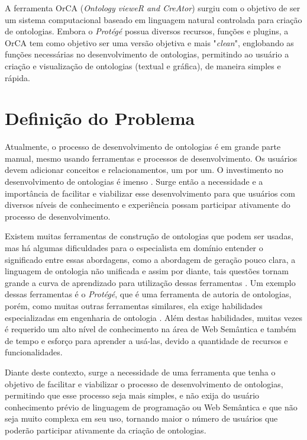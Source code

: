 \documentclass{bcc}
\begin{document}
A ferramenta OrCA (\textit{Ontology vieweR and CreAtor}) surgiu com o objetivo de ser um sistema computacional baseado em linguagem natural controlada para criação de ontologias. Embora o \textit{Protégé} possua diversos recursos, funções e plugins, a OrCA tem como objetivo ser uma versão objetiva e mais "\textit{clean}", englobando as funções necessárias no desenvolvimento de ontologias, permitindo ao usuário a criação e visualização de ontologias (textual e gráfica), de maneira simples e rápida.


\section{Definição do Problema}

Atualmente, o processo de desenvolvimento de ontologias é em grande parte manual, mesmo usando ferramentas e processos de desenvolvimento. Os usuários devem adicionar conceitos e relacionamentos, um por um. O investimento no desenvolvimento de ontologias é imenso \cite{liu2011}. Surge então a necessidade e a importância de facilitar e viabilizar esse desenvolvimento para que usuários com diversos níveis de conhecimento e experiência possam participar ativamente do processo de desenvolvimento.

Existem muitas ferramentas de construção de ontologias que podem ser usadas, mas há algumas dificuldades para o especialista em domínio entender o significado entre essas abordagens, como a abordagem de geração pouco clara, a linguagem de ontologia não unificada e assim por diante, tais questões tornam grande a curva de aprendizado para utilização dessas ferramentas \cite{zhou2010}. Um exemplo dessas ferramentas é o \textit{Protégé}, que é uma ferramenta de autoria de ontologias, porém, como muitas outras ferramentas similares, ela exige habilidades especializadas em engenharia de ontologia \cite{funk2007}. Além destas habilidades, muitas vezes é requerido um alto nível de conhecimento na área de Web Semântica e também de tempo e esforço para aprender a usá-las, devido a quantidade de recursos e funcionalidades.

Diante deste contexto, surge a necessidade de uma ferramenta que tenha o objetivo de facilitar e viabilizar o processo de desenvolvimento de ontologias, permitindo que esse processo seja mais simples, e não exija do usuário conhecimento prévio de linguagem de programação ou Web Semântica e que não seja muito complexa em seu uso, tornando maior o número de usuários que poderão participar ativamente da criação de ontologias.
\end{document}
